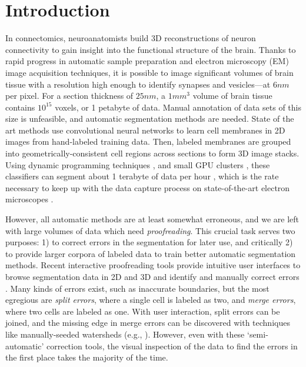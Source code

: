 \section{Introduction}


In connectomics, neuroanatomists build 3D reconstructions of neuron connectivity to gain insight into the functional structure of the brain. Thanks to rapid progress in automatic sample preparation and electron microscopy (EM) image acquisition techniques, it is possible to image significant volumes of brain tissue with a resolution high enough to identify synapses and vesicles---at $6nm$ per pixel. For a section thickness of $25nm$, a $1 mm^3$ volume of brain tissue contains $10^{15}$ voxels, or 1 petabyte of data. Manual annotation of data sets of this size is unfeasible, and automatic segmentation methods are needed. State of the art methods use convolutional neural networks to learn cell membranes in 2D images from hand-labeled training data. Then, labeled membranes are grouped into geometrically-consistent cell regions across sections to form 3D image stacks. Using dynamic programming techniques , and small GPU clusters , these classifiers can segment about 1 terabyte of data per hour , which is the rate necessary to keep up with the data capture process on state-of-the-art electron microscopes . 

However, all automatic methods are at least somewhat erroneous, and we are left with large volumes of data which need \emph{proofreading}. This crucial task serves two purposes: 1) to correct errors in the segmentation for later use, and critically 2) to provide larger corpora of labeled data to train better automatic segmentation methods. Recent interactive proofreading tools provide intuitive user interfaces to browse segmentation data in 2D and 3D and identify and manually correct errors \cite{raveler,mojo2,haehn_dojo_2014}. Many kinds of errors exist, such as inaccurate boundaries, but the most egregious are \emph{split errors}, where a single cell is labeled as two, and \emph{merge errors}, where two cells are labeled as one. With user interaction, split errors can be joined, and the missing edge in merge errors can be discovered with techniques like manually-seeded watersheds (e.g., \cite{haehn_dojo_2014}). However, even with these `semi-automatic' correction tools, the visual inspection of the data to find the errors in the first place takes the majority of the time.

